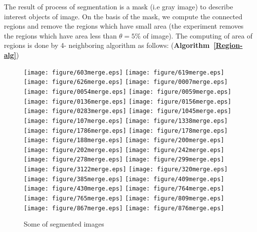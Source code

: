 \documentclass{amcs}
\begin{document}
The result of process of segmentation is a mask (i.e gray image) to describe interest objects of image. On the basis of the mask, we compute the connected regions and remove the regions which have small area (the experiment removes the regions which have area less than $\theta = 5\%$ of image). The computing of area of regions is done by 4- neighboring algorithm as follows: (\textbf{Algorithm~\ref{Region-alg}})

\begin{figure}[!ht]
	\centering
		\texttt{[image: figure/603merge.eps]}
		\texttt{[image: figure/619merge.eps]}
		\texttt{[image: figure/626merge.eps]}
		\texttt{[image: figure/0007merge.eps]}
		\texttt{[image: figure/0054merge.eps]}
		\texttt{[image: figure/0059merge.eps]}
		\texttt{[image: figure/0136merge.eps]}
		\texttt{[image: figure/0156merge.eps]}
		\texttt{[image: figure/0283merge.eps]}
		\texttt{[image: figure/1045merge.eps]}
		\texttt{[image: figure/107merge.eps]}
		\texttt{[image: figure/1338merge.eps]}
		\texttt{[image: figure/1786merge.eps]}
		\texttt{[image: figure/178merge.eps]}
		\texttt{[image: figure/188merge.eps]}
		\texttt{[image: figure/200merge.eps]}
		\texttt{[image: figure/202merge.eps]}
		\texttt{[image: figure/242merge.eps]}
		\texttt{[image: figure/278merge.eps]}
		\texttt{[image: figure/299merge.eps]}
		\texttt{[image: figure/3122merge.eps]}
		\texttt{[image: figure/320merge.eps]}
		\texttt{[image: figure/385merge.eps]}
		\texttt{[image: figure/409merge.eps]}
		\texttt{[image: figure/430merge.eps]}
		\texttt{[image: figure/764merge.eps]}
		\texttt{[image: figure/765merge.eps]}
		\texttt{[image: figure/809merge.eps]}
		\texttt{[image: figure/867merge.eps]}
		\texttt{[image: figure/876merge.eps]}
		\caption{Some of segmented images}
\end{figure}
\end{document}
